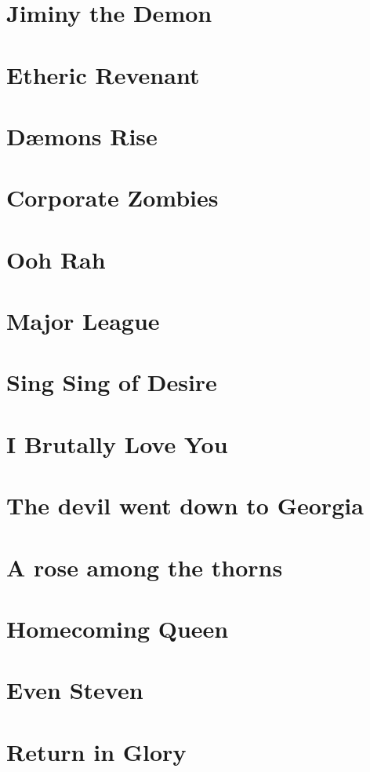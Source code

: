 \documentclass[12pt,twoside,onecolumn,openright,extrafontsizes]{memoir}
\begin{document}
\chapter{Jiminy the Demon}

\chapter{Etheric Revenant}

\chapter{D\ae mons Rise}

\chapter{Corporate Zombies}

\chapter{Ooh Rah}

\chapter{Major League}

\chapter{Sing Sing of Desire}

\chapter{I Brutally Love You}

\chapter{The devil went down to Georgia}

\chapter{A rose among the thorns}

\chapter{Homecoming Queen}

\chapter{Even Steven}

\chapter{Return in Glory}

\end{document}
